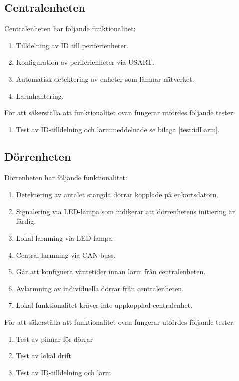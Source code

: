 \documentclass{article}
\begin{document}
 \subsection{Centralenheten}
 Centralenheten har följande funktionalitet:
 \begin{enumerate}
     \item Tilldelning av ID till periferienheter.
     \item Konfiguration av periferienheter via USART.
     \item Automatisk detektering av enheter som lämnar nätverket.
     \item Larmhantering.
 \end{enumerate}
 För att säkerställa att funktionalitet ovan fungerar utfördes följande tester:
 \begin{enumerate}
     \item Test av ID-tilldelning och larmmeddelnade se bilaga \ref{test:idLarm}.
 \end{enumerate}
 
 \subsection{Dörrenheten}
 Dörrenheten har följande funktionalitet:
 \begin{enumerate}
     \item Detektering av antalet stängda dörrar kopplade på enkortsdatorn.
     \item Signalering via LED-lampa som indikerar att dörrenhetens initiering är färdig.
     \item Lokal larmning via LED-lampa.
     \item Central larmning via CAN-buss.
     \item Går att konfiguera väntetider innan larm från centralenheten.
     \item Avlarmning av individuella dörrar från centralenheten.
     \item Lokal funktionalitet kräver inte uppkopplad centralenhet.

 \end{enumerate}
 För att säkerställa att funktionalitet ovan fungerar utfördes följande tester:
 \begin{enumerate}
     \item Test av pinnar för dörrar
     \item Test av lokal drift
     \item Test av ID-tilldelning och larm
 \end{enumerate}
\end{document}
